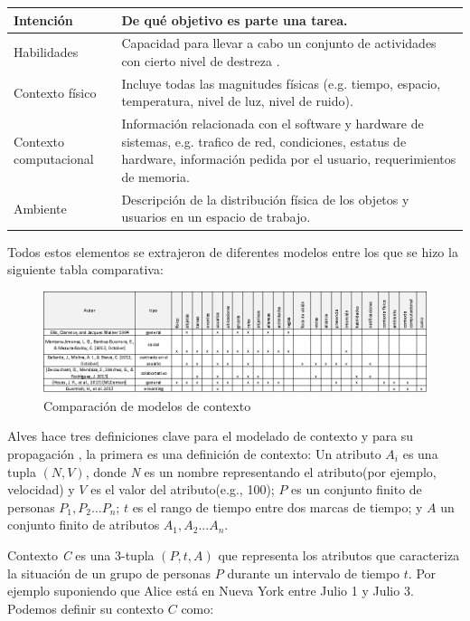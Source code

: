 \begin{center}
\begin{longtable}{|p{3cm}|p{10cm}|}
	\hline
	Intenci\'on & De qu\'e objetivo es parte una tarea\cite{gallardo2012framework}. \\
	\hline
	Habilidades & Capacidad para llevar a cabo un conjunto de actividades con cierto nivel de destreza \cite{decouchant2013adapting}. \\
	\hline
	Contexto f\'isico & Incluye todas las magnitudes f\'isicas (e.g. tiempo, espacio, temperatura, nivel de luz, nivel de ruido)\cite{hoyos2013domain}. \\
	\hline
	Contexto computacional & Informaci\'on relacionada con el software y hardware de sistemas, e.g. trafico de red, condiciones, estatus de hardware, informaci\'on pedida por el usuario, requerimientos de memoria\cite{hoyos2013domain}. \\
	\hline
	Ambiente & Descripci\'on de la distribuci\'on f\'isica de los objetos y usuarios en un espacio de trabajo\cite{hoyos2013domain}. \\
	\hline
\end{longtable}
\end{center}

Todos estos elementos se extrajeron de diferentes modelos entre los que se hizo la siguiente tabla comparativa:

\begin{figure}[h!]
  \centering
    \includegraphics[scale=0.5]{images/cmpcntx}
  \caption{Comparaci\'on de modelos de contexto\cite{ellis1994conceptual}\cite{montane2013context}\cite{gallardo2012framework}}
\end{figure}

Alves hace tres definiciones clave para el modelado de contexto y para su propagaci\'on \cite{alves2013radiator}, la primera es una definici\'on de contexto: Un atributo $A_{i}$ es una tupla $( N, V )$, donde \textit{N} es un nombre representando el atributo(por ejemplo, velocidad) y $V$ es el valor del atributo(e.g., 100); $P$ es un conjunto finito de personas ${P_{1},P_{2}...P_{n}}$; $t$ es el rango de tiempo entre dos marcas de tiempo; y $\textit{A}$ un conjunto finito de atributos ${A_{1},A_{2}...A_{n}}$.

Contexto \textit{C} es una 3-tupla $( P, t, A )$ que representa los atributos que caracteriza la situaci\'on de un grupo de personas $P$ durante un intervalo de tiempo $t$. Por ejemplo suponiendo que Alice est\'a en Nueva York entre Julio 1 y Julio 3. Podemos definir su contexto $C$ como:

